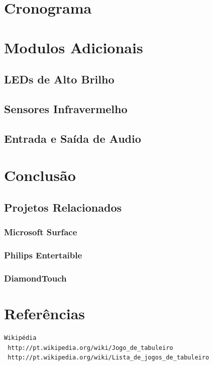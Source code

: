 \documentclass[a4paper,10pt]{article}
\begin{document}
\section{Cronograma}

\section{Modulos Adicionais}

\subsection{LEDs de Alto Brilho}

\subsection{Sensores Infravermelho}

\subsection{Entrada e Saída de Audio}

\section{Conclusão}

\subsection{Projetos Relacionados}

\subsubsection{Microsoft Surface}
\subsubsection{Philips Entertaible}
\subsubsection{DiamondTouch}

\section{Referências}

\begin{verbatim}
Wikipédia
 http://pt.wikipedia.org/wiki/Jogo_de_tabuleiro
 http://pt.wikipedia.org/wiki/Lista_de_jogos_de_tabuleiro 
\end{verbatim}
\end{document}
